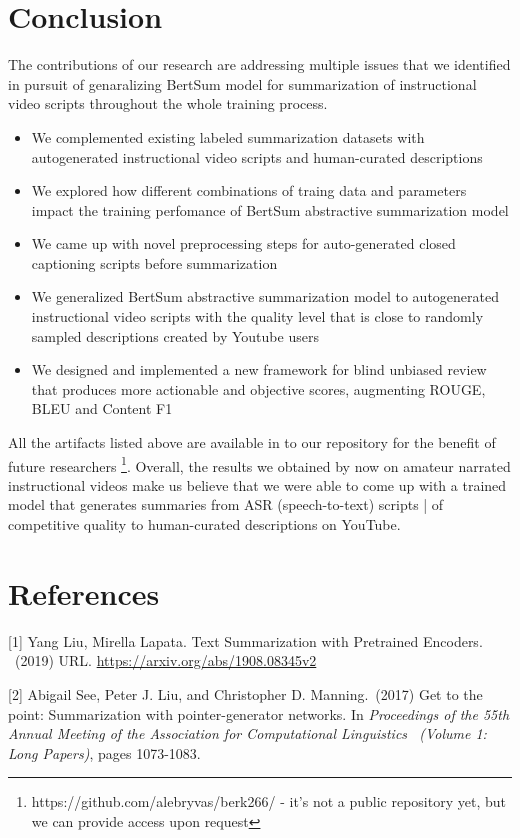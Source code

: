 \documentclass{article}
\begin{document}
\section{Conclusion}

The contributions of our research are addressing multiple issues that we identified in pursuit of genaralizing BertSum model for summarization of instructional video scripts throughout the whole training process. 

\begin{itemize}

\item We complemented existing labeled summarization datasets with autogenerated instructional video scripts and human-curated descriptions 
\item We explored how different combinations of traing data and parameters  impact the training perfomance  of BertSum abstractive summarization model
\item We came up with novel preprocessing steps for auto-generated closed captioning scripts before summarization
\item We generalized BertSum abstractive summarization model to autogenerated instructional video scripts with the quality level that is close to randomly sampled descriptions created by Youtube users
\item We designed and implemented a new framework for blind unbiased review that produces more actionable and objective scores,  augmenting ROUGE, BLEU and Content F1
\end{itemize}
 
All the artifacts listed above are available  in to our repository for the benefit of future researchers \footnote{https://github.com/alebryvas/berk266/ - it's not a public repository yet, but we can provide access upon request}. Overall, the results we obtained by now on amateur narrated instructional videos  make us believe that we were able to come up with a trained model  that generates summaries from ASR (speech-to-text) scripts | of competitive quality to human-curated descriptions on YouTube. 

\section*{References} 

[1] Yang Liu, Mirella Lapata. Text Summarization with Pretrained Encoders.  \ (2019) URL. \url{https://arxiv.org/abs/1908.08345v2}

[2] Abigail See, Peter J. Liu, and Christopher D. Manning.\ (2017) Get to the point: Summarization with pointer-generator networks. In {\it Proceedings of the 55th Annual Meeting of the Association for Computational Linguistics \ (Volume 1: Long Papers)}, pages 1073-1083.
\end{document}
